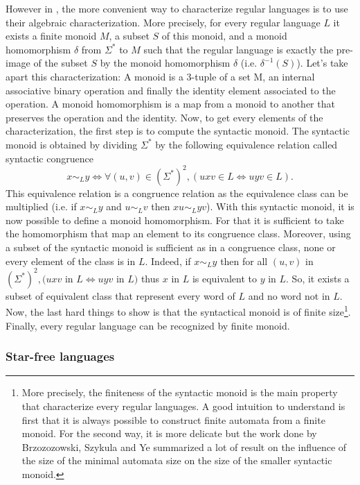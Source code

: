However in \cite{trichotomy_not_andris}, the more convenient way to characterize
regular languages is to use their algebraic characterization. More precisely,
for every regular language $L$ it exists a finite monoid $M$, a subset $S$ of this monoid,
and a monoid homomorphism $\delta$ from $\Sigma^*$ to $M$ such that the regular language is exactly
the pre-image of the subset $S$ by the monoid homomorphism $\delta$ (i.e. $\delta^{-1}(S)$).
Let's take apart this characterization: A monoid is a 3-tuple of a set M, an
internal associative binary operation and finally the identity element associated to the
operation. A monoid homomorphism is a map from a monoid to another that preserves the
operation and the identity. Now, to get every elements of the characterization, the first
step is to compute the syntactic monoid. The syntactic monoid is
obtained by dividing $\Sigma^*$ by the following equivalence relation called syntactic
congruence
\[x \sim_L y \Leftrightarrow \forall (u, v) \in \left(\Sigma^*\right)^2, (uxv \in L \Leftrightarrow uyv \in L).\]
This equivalence relation is a congruence relation as the equivalence class can be multiplied
(i.e. if $x\sim_L y$ and $u \sim_L v$ then $xu \sim_L yv$). With this syntactic monoid, it is
now possible to define a monoid homomorphism. For that it is sufficient to take the
homomorphism that map an element to its congruence class. Moreover, using a subset of the
syntactic monoid is sufficient as in a congruence class, none or every element of the class
is in $L$. Indeed, if $x \sim_L y$ then for all
$(u, v)$ in $\left(\Sigma^*\right)^2, (uxv$ in $L \Leftrightarrow uyv$ in $L)$ thus
$x$ in $L$ is equivalent to $y$ in $L$. So, it exists a subset of equivalent class that
represent every word of $L$ and no word not in $L$.
Now, the last hard things to show is that the syntactical monoid is of finite size\footnote{
    More precisely, the finiteness of the syntactic monoid is the main property that
    characterize every regular languages. A good intuition to understand is first that it
    is always possible to construct finite automata from a finite monoid. For the second way,
    it is more delicate but the work done by Brzozozowski, Szykula and Ye \cite[2018]{Brzozowski}
    summarized a lot of result on the influence of the size of the minimal automata size on
    the size of the smaller syntactic monoid.}.
Finally, every regular language can be recognized by finite monoid.

\subsubsection{Star-free languages}\label{ssec:starfree}

